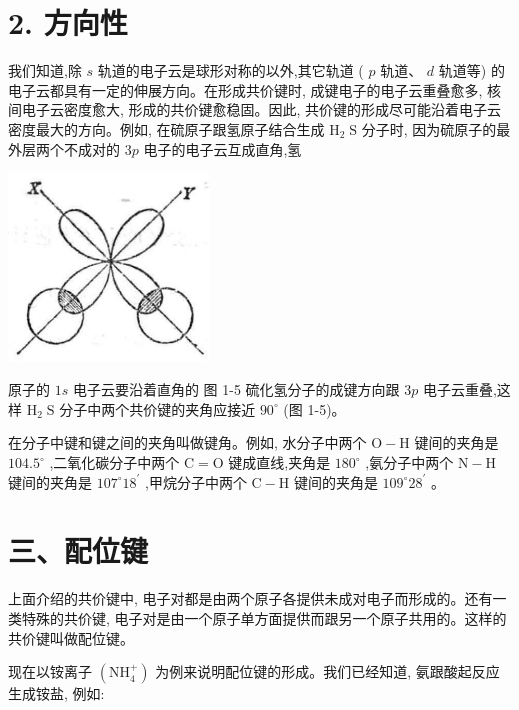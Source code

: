 \documentclass[10pt]{article}
\begin{document}
\section*{2. 方向性}

我们知道,除 \(s\) 轨道的电子云是球形对称的以外,其它轨道 ( \(p\) 轨道、 \(d\) 轨道等) 的电子云都具有一定的伸展方向。在形成共价键时, 成键电子的电子云重叠愈多, 核间电子云密度愈大, 形成的共价键愈稳固。因此, 共价键的形成尽可能沿着电子云密度最大的方向。例如, 在硫原子跟氢原子结合生成 \({\mathrm{H}}_{2}\mathrm{\;S}\) 分子时, 因为硫原子的最外层两个不成对的 \({3p}\) 电子的电子云互成直角,氢

\begin{center}
\includegraphics[max width=0.4\textwidth]{images/01912d13-9986-7822-a012-3f3f7be99dcb_16_224219.jpg}
\end{center}

原子的 \({1s}\) 电子云要沿着直角的 图 1-5 硫化氢分子的成键方向跟 \({3p}\) 电子云重叠,这样 \({\mathrm{H}}_{2}\mathrm{\;S}\) 分子中两个共价键的夹角应接近 \({90}^{ \circ }\) (图 1-5)。

在分子中键和键之间的夹角叫做键角。例如, 水分子中两个 \(\mathrm{O} - \mathrm{H}\) 键间的夹角是 \({104.5}^{ \circ }\) ,二氧化碳分子中两个 \(\mathrm{C} = \mathrm{O}\) 键成直线,夹角是 \({180}^{ \circ }\) ,氨分子中两个 \(\mathrm{N} - \mathrm{H}\) 键间的夹角是 \({107}^{ \circ }{18}^{\prime }\) ,甲烷分子中两个 \(\mathrm{C} - \mathrm{H}\) 键间的夹角是 \({109}^{ \circ }{28}^{\prime }\) 。

\section*{三、配位键}

上面介绍的共价键中, 电子对都是由两个原子各提供未成对电子而形成的。还有一类特殊的共价键, 电子对是由一个原子单方面提供而跟另一个原子共用的。这样的共价键叫做配位键。

现在以铵离子 \(\left( {\mathrm{{NH}}}_{4}^{ + }\right)\) 为例来说明配位键的形成。我们已经知道, 氨跟酸起反应生成铵盐, 例如:
\end{document}
